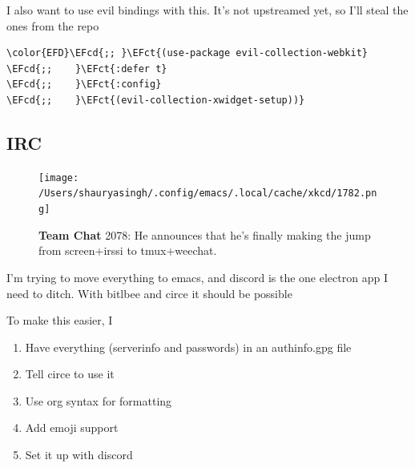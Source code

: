 \documentclass{scrartcl}
\newcommand{\EFct}[1]{\textcolor{EFct}{#1}} %
\newcommand{\EFcd}[1]{\textcolor{EFcd}{#1}} %
\begin{document}
I also want to use evil bindings with this. It's not upstreamed yet, so I'll steal the ones from the repo
\begin{Code}
\begin{Verbatim}[]
\color{EFD}\EFcd{;; }\EFct{(use-package evil-collection-webkit}
\EFcd{;;    }\EFct{:defer t}
\EFcd{;;    }\EFct{:config}
\EFcd{;;    }\EFct{(evil-collection-xwidget-setup))}
\end{Verbatim}
\end{Code}

\subsection{IRC}
\label{sec:org26b2d2a}
\begin{figure}[!htb]
	  \centering
	  \texttt{[image: /Users/shauryasingh/.config/emacs/.local/cache/xkcd/1782.png]}
  \caption*{\label{xkcd:1782} \textbf{Team Chat} 2078: He announces that he's finally making the jump from screen+irssi to tmux+weechat.}
	\end{figure}

I'm trying to move everything to emacs, and discord is the one electron app I
need to ditch. With bitlbee and circe it should be possible

To make this easier, I

\begin{enumerate}
\item Have everything (serverinfo and passwords) in an authinfo.gpg file
\item Tell circe to use it
\item Use org syntax for formatting
\item Add emoji support
\item Set it up with discord
\end{enumerate}
\end{document}
